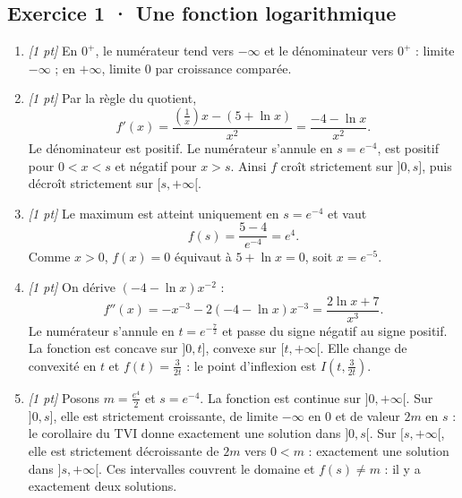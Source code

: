\subsection*{Exercice 1 · Une fonction logarithmique}\begin{enumerate}

\item \textit{[1 pt]} En $0^+$, le numérateur tend vers $-\infty$ et le dénominateur vers $0^+$ : limite $-\infty$ ; en $+\infty$, limite $0$ par croissance comparée.

\item \textit{[1 pt]} Par la règle du quotient,
\[f'(x)=\frac{(\frac{1}{x})x-(5+\ln x)}{x^2}=\frac{-4-\ln x}{x^2}.\]
Le dénominateur est positif. Le numérateur s'annule en $s=e^{-4}$, est positif pour $0<x<s$ et négatif pour $x>s$. Ainsi $f$ croît strictement sur $]0,s]$, puis décroît strictement sur $[s,+\infty[$.

\item \textit{[1 pt]} Le maximum est atteint uniquement en $s=e^{-4}$ et vaut
\[f(s)=\frac{5- 4}{e^{-4}}=e^{4}.\]
Comme $x>0$, $f(x)=0$ équivaut à $5+\ln x=0$, soit $x=e^{-5}$.

\item \textit{[1 pt]} On dérive $(-4-\ln x)x^{-2}$ :
\[f''(x)=-x^{-3}-2(-4-\ln x)x^{-3}=\frac{2\ln x+7}{x^3}.\]
Le numérateur s'annule en $t=e^{-\frac{7}{2}}$ et passe du signe négatif au signe positif. La fonction est concave sur $]0,t]$, convexe sur $[t,+\infty[$. Elle change de convexité en $t$ et $f(t)=\frac{3}{2t}$ : le point d'inflexion est $I(t,\frac{3}{2t})$.

\item \textit{[1 pt]} Posons $m=\frac{e^{4}}{2}$ et $s=e^{-4}$. La fonction est continue sur $]0,+\infty[$. Sur $]0,s]$, elle est strictement croissante, de limite $-\infty$ en $0$ et de valeur $2m$ en $s$ : le corollaire du TVI donne exactement une solution dans $]0,s[$. Sur $[s,+\infty[$, elle est strictement décroissante de $2m$ vers $0<m$ : exactement une solution dans $]s,+\infty[$. Ces intervalles couvrent le domaine et $f(s)\ne m$ : il y a exactement deux solutions.

\end{enumerate}

